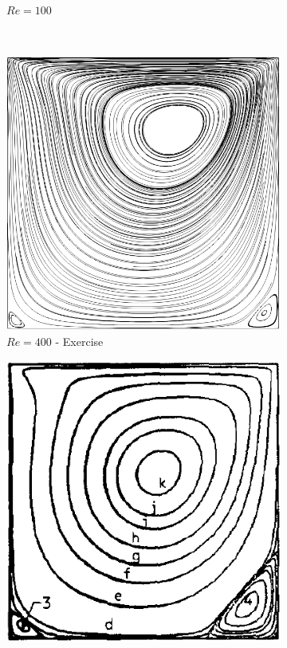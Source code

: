 \begin{figure}[H]
\begin{subfigure}[t]{0.441\textwidth}
        \caption*{$Re = 100$ \parencite{ghia_1982}}
    \end{subfigure}
    \\  %
    \begin{subfigure}[t]{0.450\textwidth}
        \includegraphics[width=\textwidth]{latex-images/Sub-figures_Example/cavity_100_streamlines.png}
        \caption*{$Re = 400$ - Exercise}
    \end{subfigure}
    \begin{subfigure}[t]{0.438\textwidth}
        \includegraphics[width=\textwidth]{latex-images/Sub-figures_Example/cavity_400_streamlines_ghia.png}

\end{subfigure}
\end{figure}

